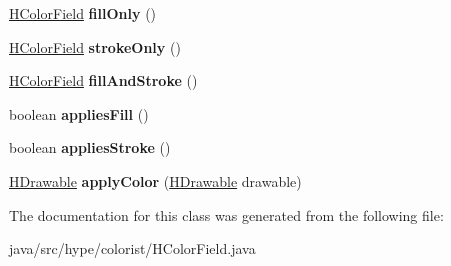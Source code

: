 \begin{DoxyCompactItemize}
\item 
\hypertarget{classhype_1_1colorist_1_1_h_color_field_ac6553b106581afbedf61aa8ac8da30ed}{\hyperlink{classhype_1_1colorist_1_1_h_color_field}{H\-Color\-Field} {\bfseries fill\-Only} ()}\label{classhype_1_1colorist_1_1_h_color_field_ac6553b106581afbedf61aa8ac8da30ed}

\item 
\hypertarget{classhype_1_1colorist_1_1_h_color_field_a8de85f8b123d449c06b42bd9e8849523}{\hyperlink{classhype_1_1colorist_1_1_h_color_field}{H\-Color\-Field} {\bfseries stroke\-Only} ()}\label{classhype_1_1colorist_1_1_h_color_field_a8de85f8b123d449c06b42bd9e8849523}

\item 
\hypertarget{classhype_1_1colorist_1_1_h_color_field_af8b807169ebbcce47a71c0192217fbea}{\hyperlink{classhype_1_1colorist_1_1_h_color_field}{H\-Color\-Field} {\bfseries fill\-And\-Stroke} ()}\label{classhype_1_1colorist_1_1_h_color_field_af8b807169ebbcce47a71c0192217fbea}

\item 
\hypertarget{classhype_1_1colorist_1_1_h_color_field_aca61204b4b1541e37a9e8d46c7abeee4}{boolean {\bfseries applies\-Fill} ()}\label{classhype_1_1colorist_1_1_h_color_field_aca61204b4b1541e37a9e8d46c7abeee4}

\item 
\hypertarget{classhype_1_1colorist_1_1_h_color_field_ae925f839b73a26464b8b0a5a0466c89e}{boolean {\bfseries applies\-Stroke} ()}\label{classhype_1_1colorist_1_1_h_color_field_ae925f839b73a26464b8b0a5a0466c89e}

\item 
\hypertarget{classhype_1_1colorist_1_1_h_color_field_aa1356a58a8aea022fa7e24a47a82e437}{\hyperlink{classhype_1_1drawable_1_1_h_drawable}{H\-Drawable} {\bfseries apply\-Color} (\hyperlink{classhype_1_1drawable_1_1_h_drawable}{H\-Drawable} drawable)}\label{classhype_1_1colorist_1_1_h_color_field_aa1356a58a8aea022fa7e24a47a82e437}

\end{DoxyCompactItemize}


The documentation for this class was generated from the following file\-:\begin{DoxyCompactItemize}
\item 
java/src/hype/colorist/H\-Color\-Field.\-java\end{DoxyCompactItemize}
